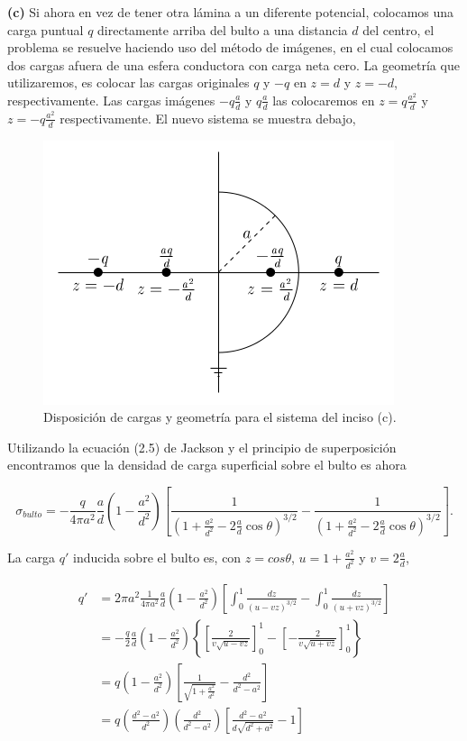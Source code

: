 \documentclass[a4paper,11pt]{article}
\numberwithin{equation}{section}
\begin{document}
\textbf{(c)} Si ahora en vez de tener otra lámina a un diferente potencial, colocamos 
una carga puntual $q$ directamente arriba del bulto a una distancia $d$ del centro, 
el problema se resuelve haciendo uso del método de imágenes, en el cual colocamos 
dos cargas afuera de una esfera conductora con carga neta cero. La geometría que 
utilizaremos, es colocar las cargas originales $q$ y $-q$ en $z=d$ y $z=-d$, 
respectivamente. Las cargas imágenes $-q\frac{a}{d}$ y $q\frac{a}{d}$ las colocaremos 
en $z=q\frac{a^2}{d}$ y $z=-q\frac{a^2}{d}$ respectivamente. El nuevo sistema 
se muestra debajo, 

\begin{figure}[H]
 \center
 \includegraphics[scale=0.8]{problema5fig3}
 \caption{Disposición de cargas y geometría para el sistema del inciso (c).}
\end{figure}

Utilizando la ecuación (2.5) de Jackson \cite{jackson3} y el principio de superposición 
encontramos que la densidad de carga superficial sobre el bulto es ahora

\begin{equation}
 \sigma_{bulto} = - \frac{q}{4\pi a^2}\frac{a}{d}\left(1 - \frac{a^2}{d^2} \right)
 \left[\frac{1}{\left(1 + \frac{a^2}{d^2} - 2\frac{a}{d}\cos{\theta}\right)^{3/2}} 
 - \frac{1}{\left(1 + \frac{a^2}{d^2} - 2\frac{a}{d}\cos{\theta}\right)^{3/2}}\right].
\end{equation}

La carga $q'$ inducida sobre el bulto es, con $z = cos\theta$, $u = 1+\frac{a^2}{d^2}$ y 
$v = 2\frac{a}{d}$, 

\begin{align*}
 q' &= 2\pi a^2 \frac{1}{4\pi a^2}\frac{a}{d}\left(1 - \frac{a^2}{d^2} \right)
 \left[\int_0^1 \frac{dz}{(u-vz)^{3/2}} - \int_0^1 \frac{dz}{(u+vz)^{3/2}} \right] \\
   &= - \frac{q}{2}\frac{a}{d}\left(1 - \frac{a^2}{d^2} \right)\left\{
   \left[\frac{2}{v\sqrt{u - vz}}\right]_0^1 - 
   \left[ - \frac{2}{v\sqrt{u + vz}}\right]_0^1\right\} \\
   &= q \left(1 - \frac{a^2}{d^2} \right) 
   \left[\frac{1}{\sqrt{1 + \frac{a^2}{d^2}}} - \frac{d^2}{d^2 - a^2} \right] \\
   &= q \left(\frac{d^2 - a^2}{d^2}\right) \left(\frac{d^2}{d^2 - a^2} \right)
   \left[\frac{d^2 - a^2}{d\sqrt{d^2 + a^2}} - 1 \right]
\end{align*}
\end{document}
